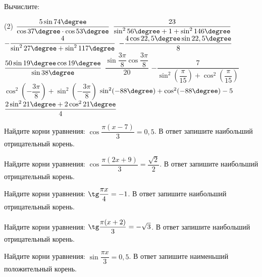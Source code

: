\begin{class}[number=3]
	\begin{listofex}
			\item Вычислите: %
		\begin{tasks}(2)
			\task \( \dfrac{ 5\sin 74 \degree }{ \cos 37 \degree \cdot \cos 53 \degree } \)
			\task \( \dfrac{ 23 }{ \sin^2 56 \degree + 1 + \sin^2 146 \degree } \)
			\task \( -\dfrac{ 4 }{ \sin^2 27 \degree + \sin^2 117 \degree } \)
			\task \( -\dfrac{ 4\cos 22,5 \degree \sin 22,5 \degree }{ 8 } \)
			\task \( \dfrac{ 50 \sin 19 \degree \cos 19 \degree }{ \sin 38 \degree } \)
			\task \( \dfrac{ \sin \dfrac{ 3\pi }{8 } \cos \dfrac{ 3\pi }{ 8 } }{ 20 } \)
			\task \( -\dfrac{ 7 }{ \sin^2 \left( \dfrac{ \pi }{ 15 } \right) + \cos^2 \left( \dfrac{ \pi }{ 15 } \right) } \)
			\task \( \cos^2\left( -\dfrac{ 3\pi }{ 8 } \right) +\sin^2\left( -\dfrac{ 3\pi }{ 8 } \right) \)
			\task \( \sin^2 (-88\degree) + \cos^2 (-88\degree) -5 \)
			\task \( \dfrac{2\sin^2 21\degree+2\cos^221\degree}{4} \)
		\end{tasks}
		\item Найдите корни уравнения: \( \cos \dfrac{ \pi(x-7) }{ 3 } = 0,5 \).  В ответ запишите наибольший отрицательный корень.
		\item Найдите корни уравнения: \( \cos \dfrac{ \pi(2x+9) }{ 3 } = \dfrac{ \sqrt{2} }{ 2 } \).  В ответ запишите наибольший отрицательный корень.
		\item Найдите корни уравнения: \( \tg \dfrac{ \pi x }{ 4 } = -1 \).  В ответ запишите наибольший отрицательный корень.
		\item Найдите корни уравнения: \( \tg \dfrac{ \pi (x+2) }{ 3 } = -\sqrt{3} \).  В ответ запишите наибольший отрицательный корень.
		\item Найдите корни уравнения: \( \sin \dfrac{ \pi x }{ 3 } = 0,5 \).  В ответ запишите наименьший положительный корень.
	\end{listofex}
\end{class}

